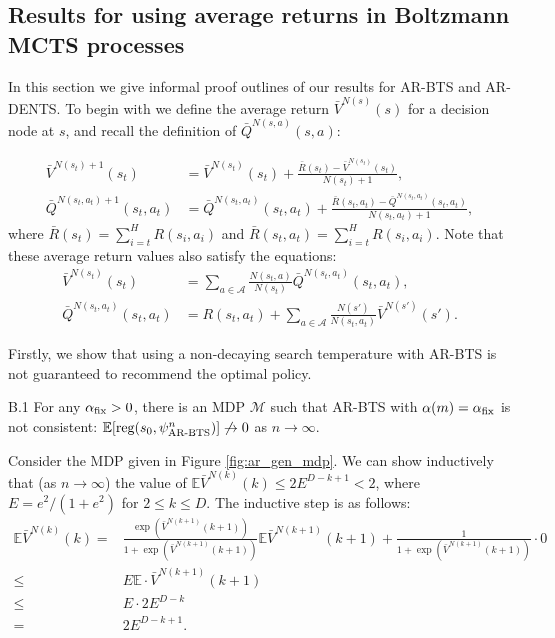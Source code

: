 \documentclass{article}
\newcommand{\bb}[1]{\mathbb{#1}}
\newcommand{\cl}[1]{\mathcal{#1}}
\newcommand{\reg}{\textnormal{reg}}
\theoremstyle{plain}
\newenvironment{proofoutline}{\proof[Proof outline]}{\endproof}
\begin{document}
\begin{appendices}
    \subsection{Results for using average returns in Boltzmann MCTS processes} \label{sec:ar_proofs}

        In this section we give informal proof outlines of our results for AR-BTS and AR-DENTS. To begin with we define the average return $\bar{V}^{N(s)}(s)$ for a decision node at $s$, and recall the definition of $\bar{Q}^{N(s,a)}(s, a)$:

        \begin{align}
            \bar{V}^{N(s_t)+1}(s_t) &= \bar{V}^{N(s_t)}(s_t) + \frac{\bar{R}(s_t) - \bar{V}^{N(s_t)}(s_t)}{N(s_t) + 1},  \label{appeq:ar_v} \\
            \bar{Q}^{N(s_t,a_t)+1}(s_t, a_t) &= \bar{Q}^{N(s_t,a_t)}(s_t, a_t) + \frac{\bar{R}(s_t,a_t) - \bar{Q}^{N(s_t,a_t)}(s_t, a_t)}{N(s_t, a_t) + 1},  \label{appeq:ar_q}
        \end{align}
        where $\bar{R}(s_t)=\sum_{i=t}^H R(s_i,a_i)$ and $\bar{R}(s_t, a_t)=\sum_{i=t}^H R(s_i,a_i)$. Note that these average return values also satisfy the equations:
        \begin{align}
            \bar{V}^{N(s_t)}(s_t) &= \sum_{a\in\cl{A}} \frac{N(s_t,a)}{N(s_t)} \bar{Q}^{N(s_t,a_t)}(s_t, a_t), \label{appeq:ar_v_rel} \\
            \bar{Q}^{N(s_t,a_t)}(s_t, a_t) &= R(s_t,a_t) + \sum_{a\in\cl{A}} \frac{N(s')}{N(s_t,a_t)} \bar{V}^{N(s')}(s'). \label{appeq:ar_q_rel}
        \end{align}






        Firstly, we show that using a non-decaying search temperature with AR-BTS is not guaranteed to recommend the optimal policy.
        \begin{customprop}{B.1}
            For any $\alpha_{\textnormal{fix}}>0$, there is an MDP $\cl{M}$ such that AR-BTS with $\alpha(m)=\alpha_{\textnormal{fix}}$ is not consistent: $\bb{E}[\reg(s_0,\psi^n_{\textnormal{AR-BTS}})] \not\to 0$ as $n\to\infty$. 
        \end{customprop}
        \begin{proofoutline}
            Consider the MDP given in Figure \ref{fig:ar_gen_mdp}. We can show inductively that (as $n\rightarrow\infty$) the value of $\bb{E}\bar{V}^{N(k)}(k)\leq 2E^{D-k+1} < 2$, where $E=e^2/(1+e^2)$ for $2\leq k \leq D$. The inductive step is as follows:
            \begin{align}
                \bb{E}\bar{V}^{N(k)}(k) =& \frac{\exp\left(\bar{V}^{N(k+1)}(k+1)\right)}{1+\exp\left(\bar{V}^{N(k+1)}(k+1)\right)} \bb{E}\bar{V}^{N(k+1)}(k+1) 
                    + \frac{1}{1+\exp\left(\bar{V}^{N(k+1)}(k+1)\right)} \cdot 0 \\
                    \leq& E \bb{E} \cdot \bar{V}^{N(k+1)}(k+1) \\
                    \leq& E \cdot 2E^{D-k} \\
                    =& 2E^{D-k+1}.
            \end{align}


\end{proofoutline}
\end{appendices}
\end{document}
